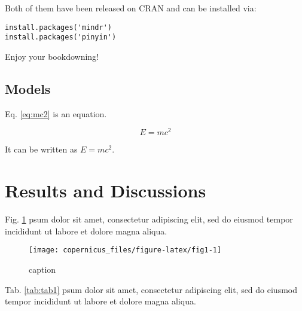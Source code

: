 \documentclass[bgd, online, hvmath]{style/copernicus-discussions}
\begin{document}
Both of them have been released on CRAN and can be installed via:

\begin{verbatim}
install.packages('mindr')
install.packages('pinyin')
\end{verbatim}

Enjoy your bookdowning!

\hypertarget{models}{%
\subsection{Models}\label{models}}

Eq. \eqref{eq:mc2} is an equation.

\begin{equation} 
E = mc^2
  \label{eq:mc2}
\end{equation}

It can be written as \(E = mc^2\).

\hypertarget{results-and-discussions}{%
\section{Results and Discussions}\label{results-and-discussions}}

Fig. \ref{fig:fig1} psum dolor sit amet, consectetur adipiscing elit, sed do eiusmod tempor incididunt ut labore et dolore magna aliqua.

\begin{figure}

{\centering \texttt{[image: copernicus\_files/figure-latex/fig1-1]} 

}

\caption{caption}\label{fig:fig1}
\end{figure}

Tab. \ref{tab:tab1} psum dolor sit amet, consectetur adipiscing elit, sed do eiusmod tempor incididunt ut labore et dolore magna aliqua.
\end{document}
